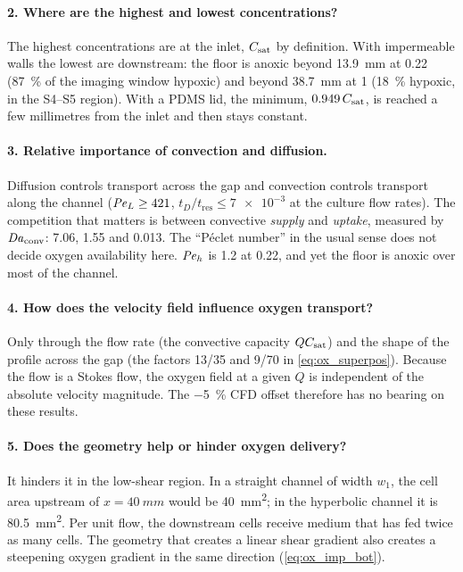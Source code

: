 \paragraph{2. Where are the highest and lowest concentrations?} The highest concentrations are at the inlet, $C_{\mathrm{sat}}$ by definition. With impermeable walls the lowest are downstream: the floor is anoxic beyond \SI{13.9}{mm} at \SI{0.22}{\uLmin} (\SI{87}{\percent} of the imaging window hypoxic) and beyond \SI{38.7}{mm} at \SI{1}{\uLmin} (\SI{18}{\percent} hypoxic, in the S4--S5 region). With a PDMS lid, the minimum, $0.949\,C_{\mathrm{sat}}$, is reached a few millimetres from the inlet and then stays constant.

\paragraph{3. Relative importance of convection and diffusion.} Diffusion controls transport across the gap and convection controls transport along the channel ($\mathit{Pe}_L\ge421$, $t_D/t_{\mathrm{res}}\le\num{7e-3}$ at the culture flow rates). The competition that matters is between convective \emph{supply} and \emph{uptake}, measured by $\mathit{Da}_{\mathrm{conv}}$: 7.06, 1.55 and 0.013. The ``P\'eclet number'' in the usual sense does not decide oxygen availability here. $\mathit{Pe}_h$ is 1.2 at \SI{0.22}{\uLmin}, and yet the floor is anoxic over most of the channel.

\paragraph{4. How does the velocity field influence oxygen transport?} Only through the flow rate (the convective capacity $QC_{\mathrm{sat}}$) and the shape of the profile across the gap (the factors 13/35 and 9/70 in \cref{eq:ox_superpos}). Because the flow is a Stokes flow, the oxygen field at a given $Q$ is independent of the absolute velocity magnitude. The \SI{-5}{\percent} CFD offset therefore has no bearing on these results.

\paragraph{5. Does the geometry help or hinder oxygen delivery?} It hinders it in the low-shear region. In a straight channel of width $w_1$, the cell area upstream of $x=\SI{40}{mm}$ would be \SI{40}{mm^2}; in the hyperbolic channel it is \SI{80.5}{mm^2}. Per unit flow, the downstream cells receive medium that has fed twice as many cells. The geometry that creates a linear shear gradient also creates a steepening oxygen gradient in the same direction (\cref{eq:ox_imp_bot}).

